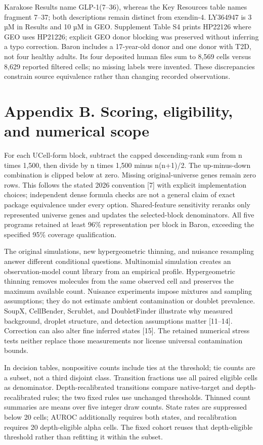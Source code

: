 \documentclass[11pt,letterpaper]{article}
\begin{document}
Karakose Results name GLP-1(7–36), whereas the Key Resources table names fragment 7–37; both descriptions remain distinct from exendin-4. LY364947 is 3 µM in Results and 10 µM in GEO. Supplement Table S4 prints HP22126 where GEO uses HP21226; explicit GEO donor blocking was preserved without inferring a typo correction. Baron includes a 17-year-old donor and one donor with T2D, not four healthy adults. Its four deposited human files sum to 8,569 cells versus 8,629 reported filtered cells; no missing labels were invented. These discrepancies constrain source equivalence rather than changing recorded observations.

\section*{Appendix B. Scoring, eligibility, and numerical scope}
For each UCell-form block, subtract the capped descending-rank sum from n times 1,500, then divide by n times 1,500 minus n(n+1)/2. The up-minus-down combination is clipped below at zero. Missing original-universe genes remain zero rows. This follows the stated 2026 convention [7] with explicit implementation choices; independent dense formula checks are not a general claim of exact package equivalence under every option. Shared-feature sensitivity reranks only represented universe genes and updates the selected-block denominators. All five programs retained at least 96\% representation per block in Baron, exceeding the specified 95\% coverage qualification.

The original simulations, new hypergeometric thinning, and nuisance resampling answer different conditional questions. Multinomial simulation creates an observation-model count library from an empirical profile. Hypergeometric thinning removes molecules from the same observed cell and preserves the maximum available count. Nuisance experiments impose mixtures and sampling assumptions; they do not estimate ambient contamination or doublet prevalence. SoupX, CellBender, Scrublet, and DoubletFinder illustrate why measured background, droplet structure, and detection assumptions matter [11–14]. Correction can also alter fine inferred states [15]. The retained numerical stress tests neither replace those measurements nor license universal contamination bounds.

In decision tables, nonpositive counts include ties at the threshold; tie counts are a subset, not a third disjoint class. Transition fractions use all paired eligible cells as denominator. Depth-recalibrated transitions compare native-target and depth-recalibrated rules; the two fixed rules use unchanged thresholds. Thinned count summaries are means over five integer draw counts. State rates are suppressed below 20 cells; AUROC additionally requires both states, and recalibration requires 20 depth-eligible alpha cells. The fixed cohort reuses that depth-eligible threshold rather than refitting it within the subset.
\end{document}
